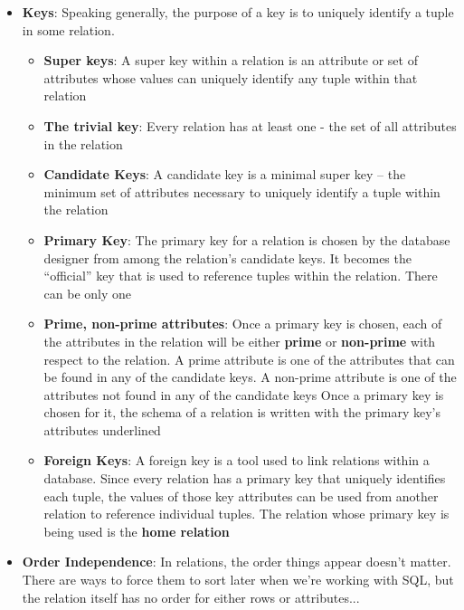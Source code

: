 \documentclass{report}
\begin{document}
\begin{itemize}
\begin{itemize}
            \end{itemize}
        \item \textbf{Keys}: Speaking generally, the purpose of a key is to uniquely identify a tuple in some relation.
            \begin{itemize}
                \item \textbf{Super keys}: A super key within a relation is an attribute or set of attributes whose values can uniquely identify any tuple within that relation
                \item \textbf{The trivial key}: Every relation has at least one - the set of all attributes in the relation 
                \item \textbf{Candidate Keys}: A candidate key is a minimal super key – the minimum set of attributes necessary to uniquely identify a tuple within the relation
                \item \textbf{Primary Key}: The primary key for a relation is chosen by the database designer from among the relation’s candidate keys. It becomes the “official” key that is used to reference tuples within the relation. There can be only one
                \item \textbf{Prime, non-prime attributes}: Once a primary key is chosen, each of the attributes in the relation will be either \textbf{prime} or \textbf{non-prime} with respect to the relation. A prime attribute is one of the attributes that can be found in any of the candidate keys. A non-prime attribute is one of the attributes not found in any of the candidate keys
                    \bigbreak \noindent 
                    Once a primary key is chosen for it, the schema of a relation is written with the primary key’s attributes underlined
                \item \textbf{Foreign Keys}: A foreign key is a tool used to link relations within a database. Since every relation has a primary key that uniquely identifies each tuple, the values of those key attributes can be used from another relation to reference individual tuples.
                    \bigbreak \noindent 
                    The relation whose primary key is being used is the \textbf{home relation}
            \end{itemize}
        \item \textbf{Order Independence}: In relations, the order things appear doesn’t matter. There are ways to force them to sort later when we’re working with SQL, but the relation itself has no order for either rows or attributes...

\end{itemize}
\end{document}
